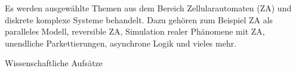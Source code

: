 \begin{course}
\begin{content}
Es werden ausgewählte Themen aus dem Bereich Zellularautomaten (ZA) und diskrete komplexe Systeme behandelt. Dazu gehören zum Beispiel ZA als paralleles Modell, reversible ZA, Simulation realer Phänomene mit ZA, unendliche Parkettierungen, asynchrone Logik und vieles mehr.


\end{content}



\begin{literature}Wissenschaftliche Aufsätze

\end{literature}



\end{course}